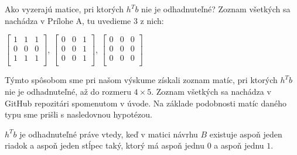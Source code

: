 Ako vyzerajú matice, pri ktorých $h^T b$ nie je odhadnuteľné? Zoznam všetkých sa nachádza v Prílohe A, tu uvedieme $3$ z nich:

\begin{center}
$
\begin{bmatrix}
1 & 1 & 1 \\
0 & 0 & 0 \\
1 & 1 & 1 \\
\end{bmatrix}
$, 
$
\begin{bmatrix}
0 & 0 & 1 \\
0 & 0 & 1 \\
0 & 0 & 1 \\
\end{bmatrix}
$, 
$
\begin{bmatrix}
0 & 0 & 0 \\
0 & 0 & 0 \\
0 & 0 & 0 \\
\end{bmatrix}
$
\end{center}

Týmto spôsobom sme pri našom výskume získali zoznam matíc, pri ktorých $h^T b$ nie je odhadnuteľné, až do rozmeru $4 \times 5$.
Zoznam všetkých sa nachádza v GitHub repozitári spomenutom v úvode. 
Na základe podobnosti matíc daného typu sme prišli s nasledovnou hypotézou.

\begin{prop}
\label{statement 1}
$h^T b$ je odhadnuteľné práve vtedy, keď v matici návrhu $B$ existuje aspoň jeden riadok a aspoň jeden stĺpec taký,
ktorý má aspoň jednu $0$ a aspoň jednu $1$.
\end{prop}

